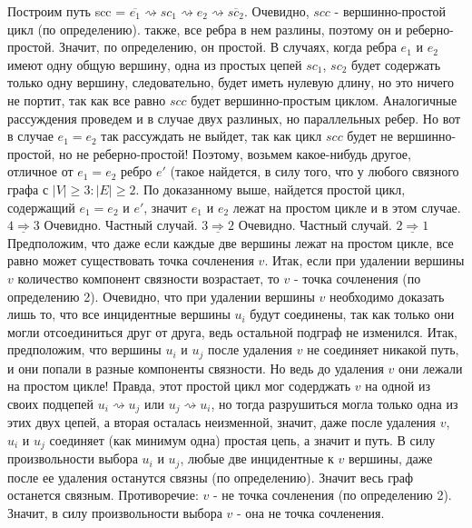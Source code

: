 \documentclass{article}
\begin{document}
\tab\tab Построим путь scc = \(\overline{e_1} \rightsquigarrow sc_1 \rightsquigarrow e_2 \rightsquigarrow \overline{sc_2}\). Очевидно,  \(scc\) - вершинно-простой цикл (по определению). также, все ребра в нем разлины, поэтому он и реберно-простой. Значит, по определению, он простой.\newline
\tab\tab В случаях, когда ребра \(e_1\) и \(e_2\) имеют одну общую вершину, одна из простых цепей \(sc_1\), \(sc_2\) будет содержать только одну вершину, следовательно, будет иметь нулевую длину, но это ничего не портит, так как все равно \(scc\) будет вершинно-простым циклом. Аналогичные рассуждения проведем и в случае двух разлиных, но параллельных ребер.
\tab\tab Но вот в случае \(e_1 = e_2\) так рассуждать не выйдет, так как цикл \(scc\) будет не вершинно-простой, но не реберно-простой! Поэтому, возьмем какое-нибудь другое, отличное от \(e_1 = e_2\) ребро \(e'\) (такое найдется, в силу того, что у любого связного графа с \(|V| \geq 3 : |E| \geq 2\). По доказанному выше, найдется простой цикл, содержащий \(e_1 = e_2\) и \(e'\), значит \(e_1\) и \(e_2\) лежат на простом цикле и в этом случае.\newline\newline
\tab \(\underline{4 \Rightarrow 3}\)\newline
Очевидно. Частный случай.\newline\newline
\tab \(\underline{3 \Rightarrow 2}\)\newline
Очевидно. Частный случай.\newline\newline
\tab \(\underline{2 \Rightarrow 1}\)\newline
\tab\tab Предположим, что даже если каждые две вершины лежат на простом цикле, все равно может существовать точка сочленения \(v\). Итак, если при удалении вершины \(v\) количество компонент связности возрастает, то \(v\) - точка сочленения (по определению 2). Очевидно, что при удалении вершины \(v\) необходимо доказать лишь то, что все инцидентные вершины \(u_i\) будут соединены, так как только они могли отсоединиться друг от друга, ведь остальной подграф не изменился.\newline
\tab\tab Итак, предположим, что вершины \(u_i\) и \(u_j\) после удаления \(v\) не соединяет никакой путь, и они попали в разные компоненты связности. Но ведь до удаления \(v\) они лежали на простом цикле! Правда, этот простой цикл мог содерджать \(v\) на одной из своих подцепей \(u_i \rightsquigarrow u_j\) или \(u_j \rightsquigarrow u_i\), но тогда разрушиться могла только одна из этих двух цепей, а вторая осталась неизменной, значит, даже после удаления \(v\), \(u_i\) и \(u_j\) соединяет (как минимум одна) простая цепь, а значит и путь. В силу произвольности выбора \(u_i\) и \(u_j\), любые две инцидентные к \(v\) вершины, даже после ее удаления останутся связны (по определению). Значит весь граф останется связным. Противоречие: \(v\) - не точка сочленения (по определению 2). Значит, в силу произвольности выбора \(v\) - она не точка сочленения.\newline\newline
\end{document}
